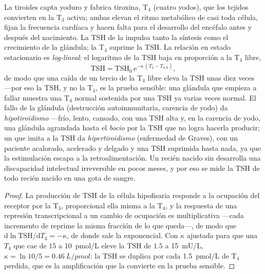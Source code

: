 \begin{proposition}\label{prop:b3:endocrinology:thyroid}
La tiroides capta yoduro y fabrica tiroxina, T$_{4}$ (cuatro yodos),
que los tejidos convierten en la T$_{3}$ activa; ambas elevan el ritmo
metabólico de casi toda célula, fijan la frecuencia cardíaca y hacen
falta para el desarrollo del encéfalo antes y después del nacimiento.
La TSH de la  impulsa tanto la síntesis como el crecimiento de
la glándula; la T$_{4}$ suprime la TSH. La relación en estado
estacionario es \emph{log-lineal}: el logaritmo de la TSH baja en
proporción a la T$_{4}$ libre,
\[
\text{TSH} = \text{TSH}_{0}\,\mathrm{e}^{-\kappa\,(T_{4} - T_{4,0})},
\]
de modo que una caída de un tercio de la T$_{4}$ libre eleva la TSH
unas diez veces ---por eso la TSH, y no la T$_{4}$, es la prueba
sensible: una glándula que empieza a fallar muestra una T$_{4}$ normal
sostenida por una TSH ya varias veces normal. El fallo de la glándula
(destrucción autoinmunitaria, carencia de yodo) da \emph{hipotiroidismo}
---frío, lento, cansado, con una TSH alta y, en la carencia de yodo,
una glándula agrandada hasta el \emph{bocio} por la TSH que no logra
hacerla producir; un  que imita a la TSH da
\emph{hipertiroidismo} (enfermedad de Graves), con un paciente
acalorado, acelerado y delgado y una TSH suprimida hasta nada, ya que
la estimulación escapa a la retroalimentación. Un recién nacido sin
 desarrolla una discapacidad intelectual irreversible
en pocos meses, y por eso se mide la TSH de todo recién nacido en una
gota de sangre.
\end{proposition}
\begin{proof}
La producción de TSH de la célula hipofisaria responde a la ocupación
del receptor por la T$_{3}$, proporcional ella misma a la T$_{4}$, y la
respuesta de una represión transcripcional a un cambio de ocupación es
multiplicativa ---cada incremento de  reprime la misma fracción
de lo que queda---, de modo que
$\mathrm{d}\ln\text{TSH}/\mathrm{d}T_{4} = -\kappa$, de donde sale la
exponencial. Con $\kappa$ ajustada para que una $T_{4}$ que cae de
$15$ a \qty{10}{pmol/L} eleve la TSH de $1.5$ a \qty{15}{mU/L},
$\kappa = \ln 10/5 = \qty{0.46}{L/pmol}$: la TSH se duplica por cada
\qty{1.5}{pmol/L} de T$_{4}$ perdida, que es la amplificación que la
convierte en la prueba sensible.
\end{proof}

